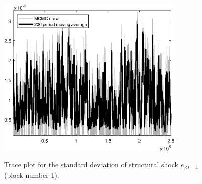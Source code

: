 \begin{figure}[H]
\centering
  \includegraphics[width=0.8\textwidth]{BRS_aggregate/graphs/TracePlot_SE_e_ZI_news_blck_1}\\
    \caption{Trace plot for the standard deviation of structural shock ${e_{ZI,-4}}$ (block number 1).}
\end{figure}
